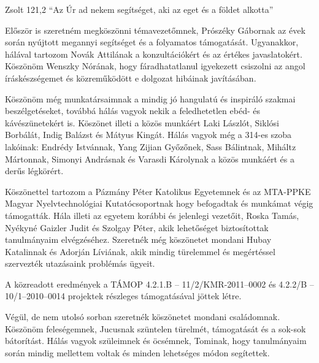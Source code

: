 \begin{chapquote}{Zsolt 121,2}
``Az Úr ad nekem segítséget, aki az eget és a földet alkotta''
\end{chapquote} 

Először is szeretném megköszönni témavezetőmnek, Prószéky Gábornak az évek során nyújtott megannyi segítséget és a folyamatos támogatását.
Ugyanakkor, hálával tartozom Novák Attilának a konzultációkért és az értékes javaslatokért.
Köszönöm Wenszky Nórának, hogy fáradhatatlanul igyekezett csiszolni az angol íráskészségemet és közreműködött e dolgozat hibáinak javításában.

Köszönöm még munkatársaimnak a mindig jó hangulatú és inspiráló szakmai beszélgetéseket, továbbá hálás vagyok nekik a feledhetetlen ebéd- és kávészünetekért is. 
Köszönet illeti a közös munkáért Laki Lászlót, Siklósi Borbálát, Indig Balázst és Mátyus Kingát.
Hálás vagyok még a 314-es szoba lakóinak: Endrédy Istvánnak, Yang Zijian Győzőnek, Sass Bálintnak, Miháltz Mártonnak, Simonyi Andrásnak és Varasdi Károlynak a közös munkáért és a derűs légkörért.

Köszönettel tartozom a Pázmány Péter Katolikus Egyetemnek és az MTA-PPKE Magyar Nyelvtechnológiai Kutatócsoportnak hogy befogadtak és munkámat végig támogatták.
Hála illeti az egyetem korábbi és jelenlegi vezetőit, Roska Tamás, Nyékyné Gaizler Judit és Szolgay Péter, akik lehetőséget biztosítottak tanulmányaim elvégzéséhez.
Szeretnék még köszönetet mondani Hubay Katalinnak és Adorján Líviának, akik mindig türelemmel és megértéssel szervezték utazásaink problémás ügyeit.

A közreadott eredmények a TÁMOP 4.2.1.B -- 11/2/KMR-2011–0002 és 4.2.2/B -- 10/1–2010–0014 projektek részleges támogatásával jöttek létre.

Végül, de nem utolsó sorban szeretnék köszönetet mondani családomnak.
Köszönöm feleségemnek, Jucusnak szüntelen türelmét, támogatását és a sok-sok bátorítást.
Hálás vagyok szüleimnek és öcsémnek, Tominak, hogy tanulmányaim során mindig mellettem voltak és minden lehetséges módon segítettek.

